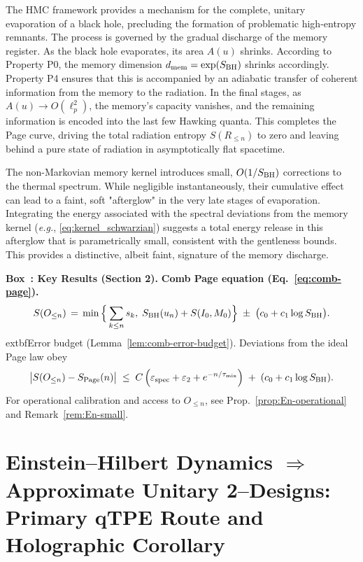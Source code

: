 \documentclass[11pt,a4paper]{article}
\providecommand{\texorpdfstring}[2]{#1}
\newcommand{\eg}{\textit{e.g.}\xspace}
\newcommand{\HMC}{\textsc{HMC}\xspace}
\newcounter{boxedresult}
\newenvironment{boxedresult}[1]{\refstepcounter{boxedresult}\begin{infobox}\noindent\textbf{Box~\theboxedresult: #1.}}{\end{infobox}}
\theoremstyle{plain}
\theoremstyle{definition}
\theoremstyle{remark}
\begin{document}
The \HMC{} framework provides a mechanism for the complete, unitary evaporation of a black hole, precluding the formation of problematic high-entropy remnants. The process is governed by the gradual discharge of the memory register.
As the black hole evaporates, its area $A(u)$ shrinks. According to Property P0, the memory dimension $d_{\rm mem} = \exp(S_{\rm BH})$ shrinks accordingly. Property P4 ensures that this is accompanied by an adiabatic transfer of coherent information from the memory to the radiation. In the final stages, as $A(u)\to O(\ell_p^2)$, the memory's capacity vanishes, and the remaining information is encoded into the last few Hawking quanta. This completes the Page curve, driving the total radiation entropy $S(R_{\le n})$ to zero and leaving behind a pure state of radiation in asymptotically flat spacetime.

The non-Markovian memory kernel introduces small, $O(1/S_{\rm BH})$ corrections to the thermal spectrum. While negligible instantaneously, their cumulative effect can lead to a faint, soft "afterglow" in the very late stages of evaporation. Integrating the energy associated with the spectral deviations from the memory kernel (\eg, \eqref{eq:kernel_schwarzian}) suggests a total energy release in this afterglow that is parametrically small, consistent with the gentleness bounds. This provides a distinctive, albeit faint, signature of the memory discharge.

\begin{boxedresult}{Key Results (Section 2)}\label{box:key-results-sec2}
\noindent\textbf{Comb Page equation (Eq.~\eqref{eq:comb-page}).}
\[
S(O_{\le n}) \,=\, \min\Big\{\sum_{k\le n} s_k,\; S_{\rm BH}(u_n)+S(I_0,M_0)\Big\}\;\pm\;\big(c_0+c_1\log S_{\rm BH}\big).
\]
    extbf{Error budget (Lemma~\ref{lem:comb-error-budget}).} Deviations from the ideal Page law obey
\[
\big|S(O_{\le n})-S_{\rm Page}(n)\big|\;\le\; C\,\Big(\varepsilon_{\rm spec}+\varepsilon_2+e^{-n/\tau_{\rm mix}}\Big)\; +\; (c_0+c_1\log S_{\rm BH}).
\]
For operational calibration and access to $O_{\le n}$, see Prop.~\ref{prop:En-operational} and Remark~\ref{rem:En-small}.
\end{boxedresult}

\section{Einstein--Hilbert Dynamics \texorpdfstring{$\Rightarrow$}{Implies} Approximate Unitary 2--Designs: Primary qTPE Route and Holographic Corollary}
\label{sec:eh2design_main}
\label{sec:EH-to-design}
\label{sec:eh2design}
\label{sec:qTPE}
\end{document}
